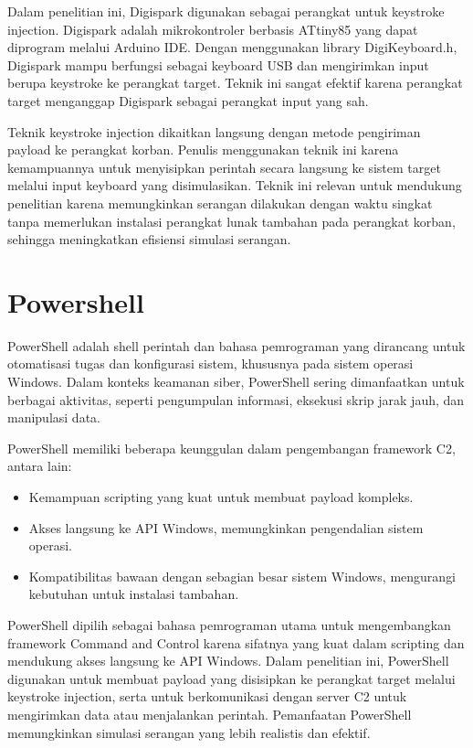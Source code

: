 Dalam penelitian ini, Digispark digunakan sebagai perangkat untuk keystroke injection. Digispark adalah mikrokontroler berbasis ATtiny85 yang dapat diprogram melalui Arduino IDE. Dengan menggunakan library DigiKeyboard.h, Digispark mampu berfungsi sebagai keyboard USB dan mengirimkan input berupa keystroke ke perangkat target. Teknik ini sangat efektif karena perangkat target menganggap Digispark sebagai perangkat input yang sah.

Teknik keystroke injection dikaitkan langsung dengan metode pengiriman payload ke perangkat korban. Penulis menggunakan teknik ini karena kemampuannya untuk menyisipkan perintah secara langsung ke sistem target melalui input keyboard yang disimulasikan. Teknik ini relevan untuk mendukung penelitian karena memungkinkan serangan dilakukan dengan waktu singkat tanpa memerlukan instalasi perangkat lunak tambahan pada perangkat korban, sehingga meningkatkan efisiensi simulasi serangan. 

\section{Powershell}
PowerShell adalah shell perintah dan bahasa pemrograman yang dirancang untuk otomatisasi tugas dan konfigurasi sistem, khususnya pada sistem operasi Windows. Dalam konteks keamanan siber, PowerShell sering dimanfaatkan untuk berbagai aktivitas, seperti pengumpulan informasi, eksekusi skrip jarak jauh, dan manipulasi data.


PowerShell memiliki beberapa keunggulan dalam pengembangan framework C2, antara lain:
\begin{itemize}
    \item Kemampuan scripting yang kuat untuk membuat payload kompleks.
    \item Akses langsung ke API Windows, memungkinkan pengendalian sistem operasi.
    \item Kompatibilitas bawaan dengan sebagian besar sistem Windows, mengurangi kebutuhan untuk instalasi tambahan. 
\end{itemize}


PowerShell dipilih sebagai bahasa pemrograman utama untuk mengembangkan framework Command and Control karena sifatnya yang kuat dalam scripting dan mendukung akses langsung ke API Windows. Dalam penelitian ini, PowerShell digunakan untuk membuat payload yang disisipkan ke perangkat target melalui keystroke injection, serta untuk berkomunikasi dengan server C2 untuk mengirimkan data atau menjalankan perintah. Pemanfaatan PowerShell memungkinkan simulasi serangan yang lebih realistis dan efektif. 
